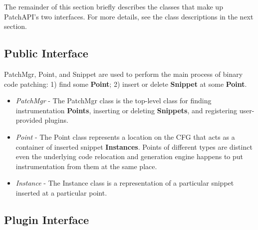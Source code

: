 The remainder of this section briefly describes the classes that make up
PatchAPI's two interfaces. For more details, see the class descriptions in the
next section.
\subsection{Public Interface}
\label{sec-2.1}

PatchMgr, Point, and Snippet are used to perform the main process of binary code
patching: 1) find some \textbf{Point}; 2) insert or delete \textbf{Snippet} at some \textbf{Point}.
\begin{itemize}
\item \emph{PatchMgr} - The PatchMgr class is the top-level class for finding
    instrumentation \textbf{Points}, inserting or deleting \textbf{Snippets}, and registering
    user-provided plugins.
\item \emph{Point} - The Point class represents a location on the CFG that acts as a
    container of inserted snippet \textbf{Instances}. Points of different types are
    distinct even the underlying code relocation and generation engine happens
    to put instrumentation from them at the same place.
\item \emph{Instance} - The Instance class is a representation of a particular snippet
    inserted at a particular point.
\end{itemize}
\subsection{Plugin Interface}
\label{sec-2.2}

